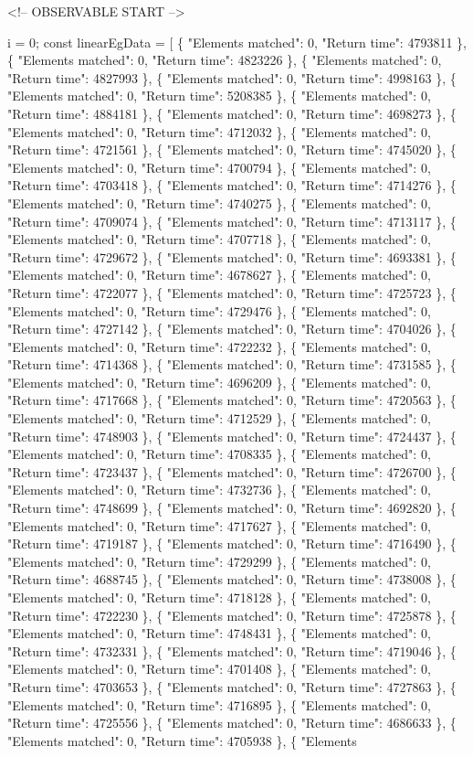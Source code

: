 		<!-- OBSERVABLE START -->





i = 0;
const linearEgData = [
\{ "Elements matched": 0, "Return time": 4793811 \}, \{ "Elements matched": 0, "Return time": 4823226 \}, \{ "Elements matched": 0, "Return time": 4827993 \}, \{ "Elements matched": 0, "Return time": 4998163 \}, \{ "Elements matched": 0, "Return time": 5208385 \}, \{ "Elements matched": 0, "Return time": 4884181 \}, \{ "Elements matched": 0, "Return time": 4698273 \}, \{ "Elements matched": 0, "Return time": 4712032 \}, \{ "Elements matched": 0, "Return time": 4721561 \}, \{ "Elements matched": 0, "Return time": 4745020 \}, \{ "Elements matched": 0, "Return time": 4700794 \}, \{ "Elements matched": 0, "Return time": 4703418 \}, \{ "Elements matched": 0, "Return time": 4714276 \}, \{ "Elements matched": 0, "Return time": 4740275 \}, \{ "Elements matched": 0, "Return time": 4709074 \}, \{ "Elements matched": 0, "Return time": 4713117 \}, \{ "Elements matched": 0, "Return time": 4707718 \}, \{ "Elements matched": 0, "Return time": 4729672 \}, \{ "Elements matched": 0, "Return time": 4693381 \}, \{ "Elements matched": 0, "Return time": 4678627 \}, \{ "Elements matched": 0, "Return time": 4722077 \}, \{ "Elements matched": 0, "Return time": 4725723 \}, \{ "Elements matched": 0, "Return time": 4729476 \}, \{ "Elements matched": 0, "Return time": 4727142 \}, \{ "Elements matched": 0, "Return time": 4704026 \}, \{ "Elements matched": 0, "Return time": 4722232 \}, \{ "Elements matched": 0, "Return time": 4714368 \}, \{ "Elements matched": 0, "Return time": 4731585 \}, \{ "Elements matched": 0, "Return time": 4696209 \}, \{ "Elements matched": 0, "Return time": 4717668 \}, \{ "Elements matched": 0, "Return time": 4720563 \}, \{ "Elements matched": 0, "Return time": 4712529 \}, \{ "Elements matched": 0, "Return time": 4748903 \}, \{ "Elements matched": 0, "Return time": 4724437 \}, \{ "Elements matched": 0, "Return time": 4708335 \}, \{ "Elements matched": 0, "Return time": 4723437 \}, \{ "Elements matched": 0, "Return time": 4726700 \}, \{ "Elements matched": 0, "Return time": 4732736 \}, \{ "Elements matched": 0, "Return time": 4748699 \}, \{ "Elements matched": 0, "Return time": 4692820 \}, \{ "Elements matched": 0, "Return time": 4717627 \}, \{ "Elements matched": 0, "Return time": 4719187 \}, \{ "Elements matched": 0, "Return time": 4716490 \}, \{ "Elements matched": 0, "Return time": 4729299 \}, \{ "Elements matched": 0, "Return time": 4688745 \}, \{ "Elements matched": 0, "Return time": 4738008 \}, \{ "Elements matched": 0, "Return time": 4718128 \}, \{ "Elements matched": 0, "Return time": 4722230 \}, \{ "Elements matched": 0, "Return time": 4725878 \}, \{ "Elements matched": 0, "Return time": 4748431 \}, \{ "Elements matched": 0, "Return time": 4732331 \}, \{ "Elements matched": 0, "Return time": 4719046 \}, \{ "Elements matched": 0, "Return time": 4701408 \}, \{ "Elements matched": 0, "Return time": 4703653 \}, \{ "Elements matched": 0, "Return time": 4727863 \}, \{ "Elements matched": 0, "Return time": 4716895 \}, \{ "Elements matched": 0, "Return time": 4725556 \}, \{ "Elements matched": 0, "Return time": 4686633 \}, \{ "Elements matched": 0, "Return time": 4705938 \}, \{ "Elements 